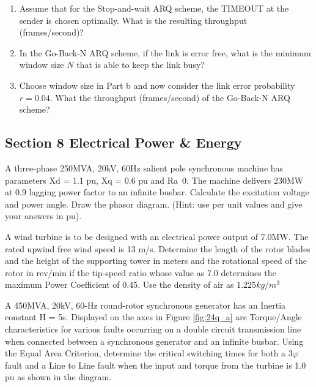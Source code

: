 \documentclass[main.tex]{subfiles}
\begin{document}
\begin{enumerate}
{    \begin{enumerate}
        \item Assume that for the Stop-and-wait ARQ scheme, the TIMEOUT at the sender is chosen optimally. What is the resulting throughput (frames/second)?
        \item  In the Go-Back-N ARQ scheme, if the link is error free, what is the minimum window size $N$ that is able to keep the link busy?
        \item Choose window size in Part b and now consider the link error probability $r=0.04$. What the throughput (frames/second) of the Go-Back-N ARQ scheme?
    \end{enumerate}

\subsection{Section 8 Electrical Power \& Energy}

\item A three-phase 250MVA, 20kV, 60Hz salient pole synchronous machine has parameters Xd = 1.1 pu, Xq = 0.6 pu and Ra~0. The machine delivers 230MW at 0.9 lagging power factor to an infinite busbar. Calculate the excitation voltage and power angle. Draw the phasor diagram. (Hint: use per unit values and give your answers in pu).

\item A wind turbine is to be designed with an electrical power output of 7.0MW. The rated upwind free wind speed is 13 m/s. Determine the length of the rotor blades and the height of the supporting tower in meters and the rotational speed of the rotor in rev/min if the tip-speed ratio whose value as 7.0 determines the maximum Power Coefficient of 0.45. Use the density of air as $\num{1.225}\unit{kg/m^3}$

\item A 450MVA, 20kV, 60-Hz round-rotor synchronous generator has an Inertia constant H = 5s. Displayed on the axes in Figure \ref{fig:24q_a} are Torque/Angle characteristics for various faults occurring on a double circuit transmission line when connected between a synchronous generator and an infinite busbar. Using the Equal Area Criterion, determine the critical switching times for both a $3 \varphi$ fault and a Line to Line fault when the input and torque from the turbine is 1.0 pu as shown in the diagram.

}
\end{enumerate}
\end{document}
